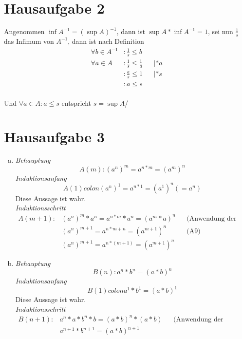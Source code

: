 \documentclass{article}
\begin{document}
\section*{Hausaufgabe 2}

Angenommen $\inf A^{-1} = (\sup A)^{-1}$, dann ist $\sup A * \inf A^{-1} = 1$, 
sei nun $\frac{1}{s}$ das Infimum von $A^{-1}$, dann ist nach Definition
\begin{align*}
  \forall b \in A^{-1} &\colon \frac{1}{s} \leq b \\
  \forall a \in A      &\colon \frac{1}{s} \leq \frac{1}{a}  && | *a \\
                       &\colon \frac{a}{s} \leq 1            && | *s \\
                       &\colon a \leq s \\
\end{align*}

Und $\forall a \in A \colon a \leq s$ entspricht $s = \sup A$/

\section*{Hausaufgabe 3}


\begin{enumerate}[a)]
\item
  \emph{Behauptung}
  \[
    A(m) \colon (a^n)^m = a^{n * m} = (a^m)^n
  \]
  \emph{Induktionsanfang}
  \[
    A(1) colon (a^n)^1 = a^{n * 1} = (a^1)^n (= a^n) 
  \]
  Diese Aussage ist wahr. \\
  \emph{Induktionsschritt}
  \begin{align*}
    A(m + 1) \colon &(a^n)^m * a^n = a^{n * m} * a^{n} = (a^m * a) ^ n  &&  \text{(Anwendung der Definition der Potenz)}\\
                    &(a^n)^{m + 1} = a^{n * m + n} = (a^{m + 1})^n      && \text{(A9)} \\
                    &(a^n)^{m + 1} = a^{n * (m + 1)} = (a^{m + 1})^n
  \end{align*}

\item
    \emph{Behauptung}
  \[
    B(n) \colon a^n * b^n = (a * b)^n
  \]
  \emph{Induktionsanfang}
  \[
    B(1) colon a^1 * b^1 = (a * b)^1 
  \]
  Diese Aussage ist wahr. \\
  \emph{Induktionsschritt}
  \begin{align*}
    B(n + 1) \colon &a^n * a * b^n * b = (a * b)^n * (a * b) &&  \text{(Anwendung der Definition der Potenz)}\\
                    &a^{n + 1} * b^{n + 1} = (a * b)^{n + 1}
  \end{align*}
\end{enumerate}
\end{document}
